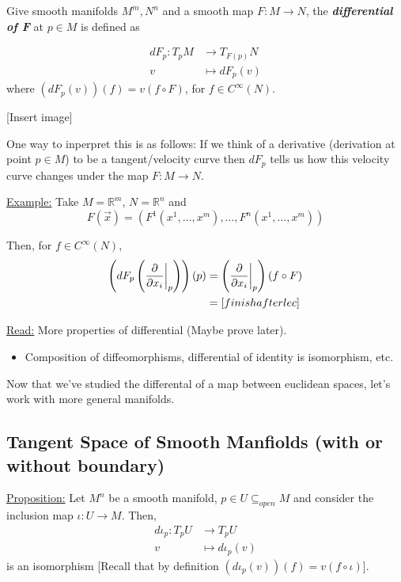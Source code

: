 \documentclass{article}
\newcommand{\R}{\mathbb{R}}
\newcommand{\restr}[2]{{%
  \left.\kern-\nulldelimiterspace %
  #1 %
  \vphantom{\big|} %
  \right|_{#2} %
  }}
\begin{document}
\begin{mathdefinitionbox}{}
  Give smooth manifolds $M^m, N^n$ and a smooth map $F : M \rightarrow N$, the \emph{\textbf{differential of F}} at $p \in M$ is defined as 

  \begin{align*}
    dF_p : T_pM &\rightarrow T_{F(p)}N \\
    v &\mapsto dF_p(v)
  \end{align*}
  where $(dF_p(v))(f) = v(f \circ F)$, for $f \in C^{\infty}(N)$.

  \vskip 0.5cm
  [Insert image]

  \vskip 0.5cm
  One way to inperpret this is as follows: If we think of a derivative (derivation at point $p \in M$) to be a tangent/velocity curve then $dF_p$ tells us how this velocity curve changes under the map $F : M \rightarrow N$.
\end{mathdefinitionbox}

\vskip 0.5cm
\underline{Example:} Take $M = \R^m$, $N = \R^n$ and 
\[ F(\vec{x}) = \left( F^1(x^1, \dots, x^m), \dots, F^n(x^1, \dots, x^m) \right) \]

Then, for $f \in C^{\infty}(N)$, 
\begin{align*}
  \left( dF_p \left( \restr{\frac{\partial}{\partial x_i}}{p} \right) \right) (p) &= \left( \restr{\frac{\partial}{\partial x_i}}{p} \right) \left( f \circ F \right) \\
  &= [finish after lec]
\end{align*}


\vskip 0.5cm
\underline{Read:} More properties of differential (Maybe prove later).

\begin{itemize}
  \item Composition of diffeomorphisms, differential of identity is isomorphism, etc.
\end{itemize}

Now that we've studied the differental of a map between euclidean spaces, let's work with more general manifolds.

\vskip 1cm
\subsection{Tangent Space of Smooth Manfiolds (with or without boundary)}

\vskip 0.5cm
\begin{dottedbox}
  \underline{Proposition:} Let $M^n$ be a smooth manifold, $p \in U \subseteq_{open} M$ and consider the inclusion map $\iota : U \rightarrow M$. Then, 
  \begin{align*}
    d \iota_p : T_pU &\rightarrow T_pU \\
    v &\mapsto d \iota_p(v)
  \end{align*}
  is an isomorphism [Recall that by definition $(d \iota_p(v))(f) = v\left( f \circ \iota \right)$].
\end{dottedbox}
\end{document}
